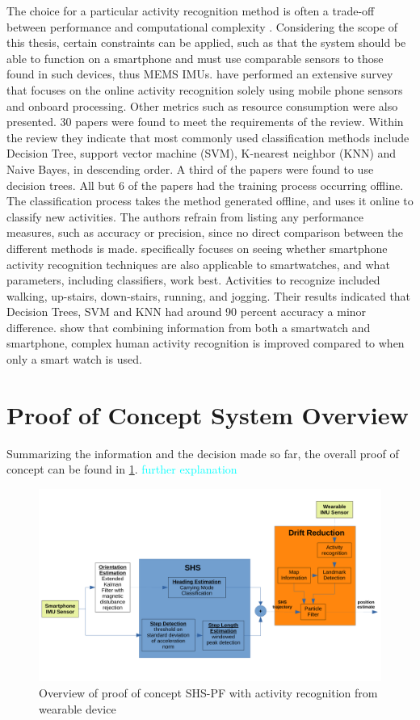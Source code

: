 
The choice for a particular activity recognition method is often a trade-off between performance and computational complexity \cite{Bulling2014}. Considering the scope of this thesis, certain constraints can be applied, such as that the system should be able to function on a smartphone and must use comparable sensors to those found in such devices, thus MEMS IMUs. \citet{Shoaib2015} have performed an extensive survey that focuses on the online activity recognition solely using mobile phone sensors and onboard processing. Other metrics such as resource consumption were also presented. 30 papers were found to meet the requirements of the review. Within the review they indicate that most commonly used classification methods include Decision Tree, support vector machine (SVM), K-nearest neighbor (KNN) and Naive Bayes, in descending order. A third of the papers were found to use decision trees. All but 6 of the papers had the training process occurring offline. The classification process takes the method generated offline, and uses it online to classify new activities. The authors refrain from listing any performance measures, such as accuracy or precision, since no direct comparison between the different methods is made. \citet{Ahmad2020} specifically focuses on seeing whether smartphone activity recognition techniques are also applicable to smartwatches, and what parameters, including classifiers, work best. Activities to recognize included walking, up-stairs, down-stairs, running, and jogging. Their results indicated that  Decision Trees, SVM and KNN had around 90 percent accuracy a minor difference. \citet{Shoaib2016} show that combining information from both a smartwatch and smartphone, complex human activity recognition is improved compared to when only a smart watch is used. 

\section{Proof of Concept System Overview}
Summarizing the information and the decision made so far, the overall proof of concept can be found in \cref{fig:system_design}.
\textcolor{cyan}{further explanation}

\begin{figure}[H]
	\centering
	\includegraphics[width=0.6\linewidth]{images/system_design}
	\caption{Overview of proof of concept SHS-PF with activity recognition from wearable device}
	\label{fig:system_design}
\end{figure}



